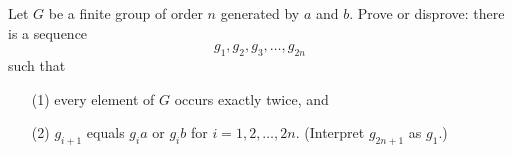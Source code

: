 Let $G$ be a finite group of order $n$ generated by $a$ and
$b$. Prove or disprove: there is a sequence
\[
g_1, g_2, g_3, \dots, g_{2n}
\]
such that
\begin{itemize}
   \item[(1)] every element of $G$ occurs exactly twice, and
   \item[(2)] $g_{i+1}$ equals $g_i a$ or $g_i b$ for $i = 1, 2, \dots,
   2n$. (Interpret $g_{2n+1}$ as $g_1$.)
\end{itemize}
